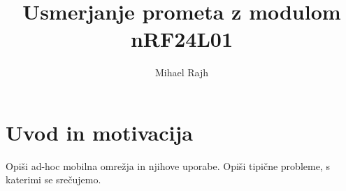 %
%
%


%
%
%
%
%
%
%
%
\graphicspath{{Skupina01/img/}}


\title{Usmerjanje prometa z modulom nRF24L01}
\author{Mihael Rajh}

%
%
\maketitle



\section{Uvod in motivacija}
Opiši ad-hoc mobilna omrežja in njihove uporabe. Opiši tipične probleme, s katerimi se srečujemo.

